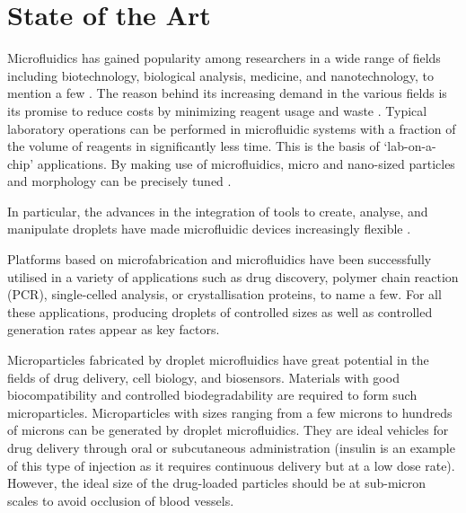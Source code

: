 \section{State of the Art}



Microfluidics has gained popularity among researchers in a wide range of fields including biotechnology, biological analysis, medicine, and nanotechnology, to mention a few \parencite{carla2019,Chen2013,Rabiee2021,Scheler2019}. The reason behind its increasing demand in the various fields is its promise to reduce costs by minimizing reagent usage and waste \parencite{Pinto2014}. Typical laboratory operations can be performed in microfluidic systems with a fraction of the volume of reagents in significantly less time. This is the basis of ‘lab-on-a-chip’ applications. By making use of microfluidics, micro and nano-sized particles and morphology can be precisely tuned \parencite{Pinto2014}.
\blankline

In particular, the advances in the integration of tools to create, analyse, and manipulate droplets have made microfluidic devices increasingly flexible \parencite{Nge2013}.

Platforms based on microfabrication and microfluidics have been successfully utilised in a variety of applications such as drug discovery, polymer chain reaction (PCR), single-celled analysis, or crystallisation proteins, to name a few. For all these applications, producing droplets of controlled sizes as well as controlled generation rates appear as key factors.\parencite{Krsti2018,Li2018}

Microparticles fabricated by droplet microfluidics have great potential in the fields of drug delivery, cell biology, and biosensors. Materials with good biocompatibility and controlled biodegradability are required to form such microparticles. Microparticles with sizes ranging from a few microns to hundreds of microns can be generated by droplet microfluidics. They are ideal vehicles for drug delivery through oral or subcutaneous administration (insulin is an example of this type of injection as it requires continuous delivery but at a low dose rate). However, the ideal size of the drug-loaded particles should be at sub-micron scales to avoid occlusion of blood vessels.

